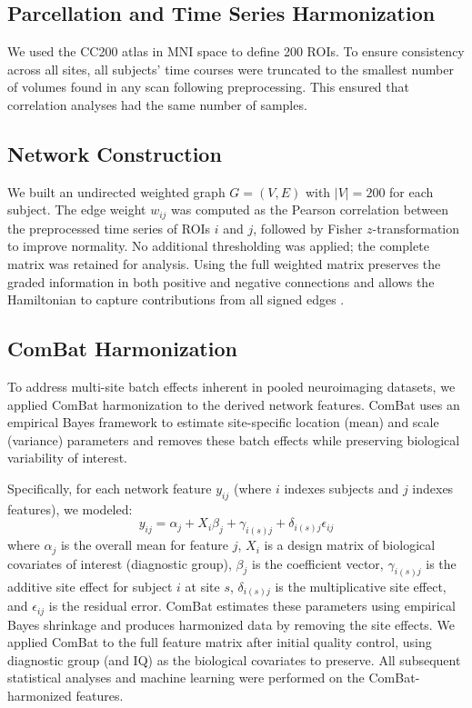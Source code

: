 \documentclass[10pt,letterpaper]{article}
\begin{document}
\subsection*{Parcellation and Time Series Harmonization}
We used the CC200 atlas in MNI space to define 200 ROIs. To ensure consistency across all sites,
all subjects' time courses were truncated to the smallest number of volumes found in any scan
following preprocessing. This ensured that correlation analyses had the same number of samples.

\subsection*{Network Construction}
We built an undirected weighted graph $G=(V,E)$ with $|V|=200$ for each subject. The edge weight
$w_{ij}$ was computed as the Pearson correlation between the preprocessed time series of ROIs $i$
and $j$, followed by Fisher $z$-transformation to improve normality. No additional thresholding was
applied; the complete matrix was retained for analysis. Using the full weighted matrix preserves
the graded information in both positive and negative connections and allows the Hamiltonian to
capture contributions from all signed edges \cite{Smith:2013fc,Fornito2016}.

\subsection*{ComBat Harmonization}
To address multi-site batch effects inherent in pooled neuroimaging datasets, we applied ComBat
harmonization \cite{Johnson2007,Fortin2017} to the derived network features. ComBat uses an
empirical Bayes framework to estimate site-specific location (mean) and scale (variance) parameters
and removes these batch effects while preserving biological variability of interest.

Specifically, for each network feature $y_{ij}$ (where $i$ indexes subjects and $j$ indexes
features), we modeled:
\[
y_{ij} = \alpha_j + X_i \beta_j + \gamma_{i(s)j} + \delta_{i(s)j} \epsilon_{ij}
\]
where $\alpha_j$ is the overall mean for feature $j$, $X_i$ is a design matrix of biological
covariates of interest (diagnostic group), $\beta_j$ is the coefficient vector, $\gamma_{i(s)j}$
is the additive site effect for subject $i$ at site $s$, $\delta_{i(s)j}$ is the multiplicative
site effect, and $\epsilon_{ij}$ is the residual error. ComBat estimates these parameters using
empirical Bayes shrinkage and produces harmonized data by removing the site effects. We applied
ComBat to the full feature matrix after initial quality control, using diagnostic group (and IQ) as
the biological covariates to preserve. All subsequent statistical analyses and machine learning were
performed on the ComBat-harmonized features.
\end{document}
